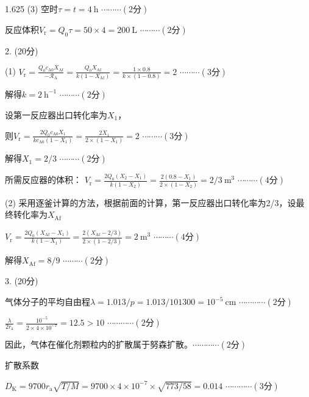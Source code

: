 \documentclass[12pt, b5paper]{article}
\begin{document}
\begin{spacing}{1.625}
(3) 空时$\tau = t = 4\ \mathrm{h}$ \hfill $\cdots \cdots \cdots (2\text{分})$

反应体积$V_\mathrm{r} = Q_0\tau = 50\times 4 = 200 \ \mathrm{L}$ \hfill $\cdots \cdots \cdots (2\text{分})$

\bigskip

2. (20分) 

(1) $V_\mathrm{r} = \frac{Q_0c_\mathrm{A0}X_\mathrm{Af}}{-\mathscr{R}_\mathrm{A}} = \frac{Q_0X_\mathrm{Af}}{k(1-X_\mathrm{Af})} = \frac{1\times 0.8}{k\times (1-0.8)} = 2$ \hfill $\cdots \cdots \cdots (3\text{分})$

解得$k = 2 \ \mathrm{h^{-1}}$ \hfill $\cdots \cdots \cdots (2\text{分})$

设第一反应器出口转化率为$X_1$，

则$V_\mathrm{r} = \frac{2Q_0c_\mathrm{A0}X_1}{kc_\mathrm{A0}(1-X_1)} = \frac{2X_1}{2\times (1-X_1)} = 2$ \hfill $\cdots \cdots \cdots (3\text{分})$

解得$X_1 = 2/3$ \hfill $\cdots \cdots \cdots (2\text{分})$

所需反应器的体积：
$V_\mathrm{r} = \frac{2Q_0(X_2-X_1)}{k(1-X_2)} = \frac{2(0.8-X_1)}{2\times (1-X_2)} = 2/3 \ \mathrm{m^3}$ \hfill $\cdots \cdots \cdots (4\text{分})$

(2) 采用逐釜计算的方法，根据前面的计算，第一反应器出口转化率为2/3，设最终转化率为$X_\mathrm{Af}$

$V_\mathrm{r} = \frac{2Q_0(X_\mathrm{Af}-X_1)}{k(1-X_1)} = \frac{2(X_\mathrm{Af}-2/3)}{2\times (1-2/3)} = 2 \ \mathrm{m^3}$ \hfill $\cdots \cdots \cdots (4\text{分})$

解得$X_\mathrm{Af} = 8/9$ \hfill $\cdots \cdots \cdots (2\text{分})$

\bigskip

3. (20分) 

气体分子的平均自由程$\lambda = 1.013/p = 1.013/101300 = 10^{-5} \ \mathrm{cm}$ \hfill  $\cdots \cdots \cdots \cdots (2\text{分})$ 

$\frac{\lambda}{2r_\mathrm{a}} = \frac{10^{-5}}{2\times 4\times 10^{-7}} = 12.5 > 10$  \hfill  $\cdots \cdots \cdots \cdots (2\text{分})$ 

因此，气体在催化剂颗粒内的扩散属于努森扩散。\hfill  $\cdots \cdots \cdots \cdots (2\text{分})$ 

扩散系数

$D_\mathrm{K} = 9700r_\mathrm{a}\sqrt{T/M} = 9700\times 4\times 10^{-7} \times \sqrt{773/58} = 0.014$ \hfill  $\cdots \cdots \cdots \cdots (3\text{分})$ 


\end{spacing}
\end{document}
